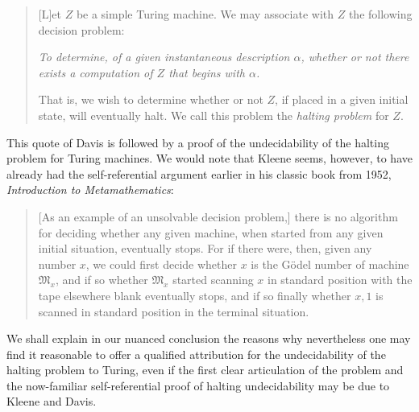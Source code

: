 \documentclass[12pt]{amsart}
\begin{document}
\begin{quote}\small

[L]et $Z$ be a simple Turing machine. We may associate with $Z$ the following decision problem: 

\textit{To determine, of a given instantaneous description $\alpha$, whether or not there exists a computation of $Z$ that begins with $\alpha$.}

That is, we wish to determine whether or not $Z$, if placed in a given initial state, will eventually halt. We call this problem the \textit{halting problem} for $Z$. \cite[p. 70]{davis1958computability}
\end{quote}
This quote of Davis is followed by a proof of the undecidability of the halting problem for Turing machines. %
We would note that Kleene seems, however, to have already had the self-referential argument earlier in his classic book from 1952, \textit{Introduction to Metamathematics}:
\begin{quote}\small
    [As an example of an unsolvable decision problem,] there is no algorithm for deciding whether any given machine, when started from any given initial situation, eventually stops. For if there were, then, given any number $x$, we could first decide whether $x$ is the Gödel number of machine $\mathfrak{M}_x$, and if so whether $\mathfrak{M}_x$ started scanning $x$ in standard position with the tape elsewhere blank eventually stops, and if so finally whether $x,\!1$ is scanned in standard position in the terminal situation. \cite[p. 382]{kleene1952metamathematics}
\end{quote}
We shall explain in our nuanced conclusion the reasons why nevertheless one may find it reasonable to offer a qualified attribution for the undecidability of the halting problem to Turing, even if the first clear articulation of the problem and the now-familiar self-referential proof of halting undecidability may be due to Kleene and Davis.
\end{document}
